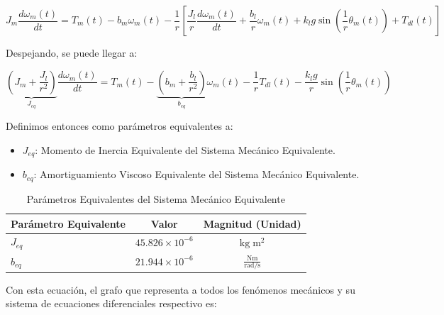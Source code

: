 \documentclass[blue,fullpaper]{ludusofficial}  %
\begin{document}
\[
J_{m} \frac{d\omega_{m}(t)}{dt} = T_{m}(t) - b_{m}\omega_{m}(t) - \frac{1}{r} \left[ \frac{J_{l}}{r} \frac{d\omega_{m}(t)}{dt} + \frac{b_{l}}{r} \omega_{m}(t) + k_{l} g \sin \left( \frac{1}{r} \theta_{m}(t) \right) + T_{dl}(t) \right]
\]

Despejando, se puede llegar a:

\[
\underbrace{ \left( J_{m}+\frac{J_{l}}{r^{2}} \right)  }_{ J_{eq} } \frac{d\omega_{m}(t)}{dt} = T_{m}(t) - \underbrace{ \left( b_{m} + \frac{b_{l}}{r^{2}} \right) }_{ b_{eq} }  \omega_{m}(t) -  \frac{1}{r} T_{dl}(t)  - \frac{k_{l}g}{r} \sin \left(  \frac{1}{r} \theta_{m}(t) \right)
\]

Definimos entonces como parámetros equivalentes a:

\begin{itemize}
    \item$J_{eq}$: Momento de Inercia Equivalente del Sistema Mecánico Equivalente.
    \item$b_{eq}$: Amortiguamiento Viscoso Equivalente del Sistema Mecánico Equivalente.
\end{itemize}

\begin{table}[htbp]
    \centering
    \caption{Parámetros Equivalentes del Sistema Mecánico Equivalente}
    \small
    \begin{tabular}{lcc}
        \hline
        \textbf{Parámetro Equivalente} & \textbf{Valor} & \textbf{Magnitud (Unidad)} \\
        \hline
        $J_{eq}$ & $45.826 \times 10^{-6}$ & $\mathrm{\mathrm{kg \; m^2}}$ \\
        $b_{eq}$ & $21.944 \times 10^{-6}$ & $\mathrm{\mathrm{\frac{Nm}{rad/s}}}$ \\
        \hline
    \end{tabular}
\end{table}

\newpage
Con esta ecuación, el grafo que representa a todos los fenómenos mecánicos y su sistema de ecuaciones diferenciales respectivo es:
\end{document}

